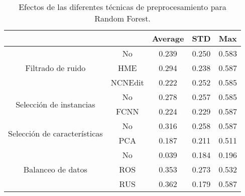 \begin{table}
    \centering
    \begin{tabular}{cc|c|c|c|}
    \cline{3-5}
    \multicolumn{1}{l}{\textbf{}} & \textbf{} & \multicolumn{1}{c|}{\textbf{Average}} & \multicolumn{1}{c|}{\textbf{STD}} & \textbf{Max} \\ \hline
    \multicolumn{1}{|c|}{\multirow{3}{*}{Filtrado de ruido}}       & No        & 0.239  & 0.250
    & 0.583    \\ \cline{2-5} 
    \multicolumn{1}{|c|}{}  & HME       & 0.294  & 0.238
    & 0.587        \\ \cline{2-5} 
    \multicolumn{1}{|c|}{}  & NCNEdit   & 0.222  & 0.252
    & 0.585        \\ \hline
    \multicolumn{1}{|c|}{\multirow{2}{*}{Selección de instancias}} & No        & 0.278   & 0.257
    & 0.585        \\ \cline{2-5} 
    \multicolumn{1}{|c|}{}  & FCNN      & 0.224  & 0.229
    & 0.587        \\ \hline
    \multicolumn{1}{|c|}{\multirow{2}{*}{Selección de características}} & No        & 0.316  &  0.258
    & 0.587        \\ \cline{2-5} 
    \multicolumn{1}{|c|}{}  & PCA      & 0.187   & 0.211
    & 0.511        \\ \hline
    \multicolumn{1}{|c|}{\multirow{3}{*}{Balanceo de datos}}       & No        & 0.039  & 0.184
    & 0.196        \\ \cline{2-5} 
    \multicolumn{1}{|c|}{}  & ROS       & 0.353  & 0.273
    & 0.532        \\ \cline{2-5} 
    \multicolumn{1}{|c|}{}  & RUS       & 0.362  & 0.179
    & 0.587        \\ \hline
    \end{tabular}
    \caption{Efectos de las diferentes técnicas de preprocesamiento para Random Forest.}
    \label{rf}
\end{table}


